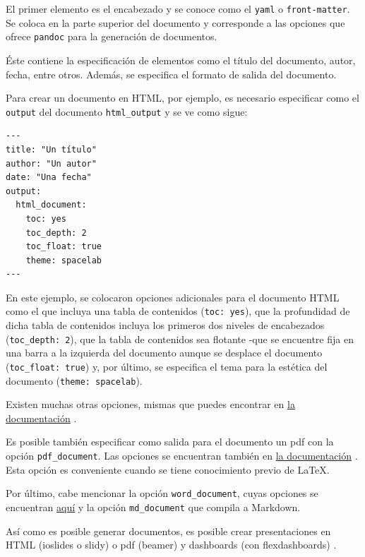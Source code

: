 \documentclass[]{article}
\begin{document}
El primer elemento es el encabezado y se conoce como el \texttt{yaml} o
\texttt{front-matter}. Se coloca en la parte superior del documento y
corresponde a las opciones que ofrece \texttt{pandoc} para la generación
de documentos.

Éste contiene la especificación de elementos como el título del
documento, autor, fecha, entre otros. Además, se especifica el formato
de salida del documento.

Para crear un documento en HTML, por ejemplo, es necesario especificar
como el \texttt{output} del documento \texttt{html\_output} y se ve como
sigue:

\begin{verbatim}
---
title: "Un título"
author: "Un autor"
date: "Una fecha"
output: 
  html_document:
    toc: yes
    toc_depth: 2
    toc_float: true
    theme: spacelab
---
\end{verbatim}

En este ejemplo, se colocaron opciones adicionales para el documento
HTML como el que incluya una tabla de contenidos (\texttt{toc:\ yes}),
que la profundidad de dicha tabla de contenidos incluya los primeros dos
niveles de encabezados (\texttt{toc\_depth:\ 2}), que la tabla de
contenidos sea flotante -que se encuentre fija en una barra a la
izquierda del documento aunque se desplace el documento
(\texttt{toc\_float:\ true}) y, por último, se especifica el tema para
la estética del documento (\texttt{theme:\ spacelab}).

Existen muchas otras opciones, mismas que puedes encontrar en
\href{http://rmarkdown.rstudio.com/html_document_format.html}{la
documentación} \parencite{rmarkdownhtml}.

Es posible también especificar como salida para el documento un pdf con
la opción \texttt{pdf\_document}. Las opciones se encuentran también en
\href{http://rmarkdown.rstudio.com/pdf_document_format.html}{la
documentación} \parencite{rmarkdownpdf}. Esta opción es conveniente
cuando se tiene conocimiento previo de LaTeX.

Por último, cabe mencionar la opción \texttt{word\_document}, cuyas
opciones se encuentran
\href{http://rmarkdown.rstudio.com/word_document_format.html}{aquí}
\parencite{rmarkdownword} y la opción \texttt{md\_document} que compila
a Markdown.

Así como es posible generar documentos, es posible crear presentaciones
en HTML (ioslides o slidy) o pdf (beamer) \parencite{rmarkdownreference}
y dashboards (con flexdashboards) \parencite{flexdashboard}.
\end{document}
